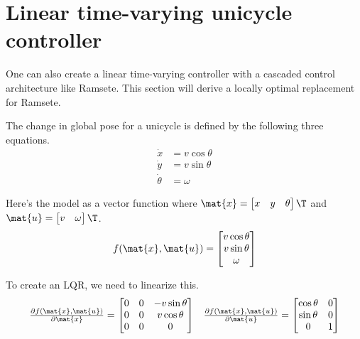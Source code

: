 \section{Linear time-varying unicycle controller}

One can also create a linear time-varying controller with a cascaded control
architecture like Ramsete. This section will derive a locally optimal
replacement for Ramsete.

The change in global pose for a unicycle is defined by the following three
equations.
\begin{align*}
  \dot{x} &= v\cos\theta \\
  \dot{y} &= v\sin\theta \\
  \dot{\theta} &= \omega
\end{align*}

Here's the model as a vector function where
$\mat{x} = \begin{bmatrix} x & y & \theta \end{bmatrix}\T$ and
$\mat{u} = \begin{bmatrix} v & \omega \end{bmatrix}\T$.
\begin{equation}
  f(\mat{x}, \mat{u}) =
  \begin{bmatrix}
    v\cos\theta \\
    v\sin\theta \\
    \omega
  \end{bmatrix}
\end{equation}

To create an LQR, we need to linearize this.
\begin{equation*}
  \begin{array}{ll}
    \frac{\partial f(\mat{x}, \mat{u})}{\partial\mat{x}} =
    \begin{bmatrix}
      0 & 0 & -v\sin\theta \\
      0 & 0 & v\cos\theta \\
      0 & 0 & 0
    \end{bmatrix} &
    \frac{\partial f(\mat{x}, \mat{u})}{\partial\mat{u}} =
    \begin{bmatrix}
      \cos\theta & 0 \\
      \sin\theta & 0 \\
      0 & 1
    \end{bmatrix}
  \end{array}
\end{equation*}

